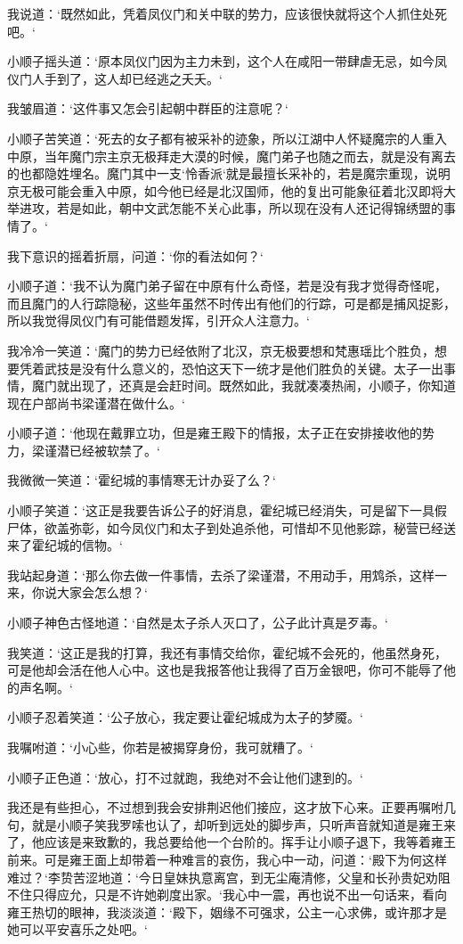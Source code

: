 我说道：‘既然如此，凭着凤仪门和关中联的势力，应该很快就将这个人抓住处死吧。‘

小顺子摇头道：‘原本凤仪门因为主力未到，这个人在咸阳一带肆虐无忌，如今凤仪门人手到了，这人却已经逃之夭夭。‘

我皱眉道：‘这件事又怎会引起朝中群臣的注意呢？‘

小顺子苦笑道：‘死去的女子都有被采补的迹象，所以江湖中人怀疑魔宗的人重入中原，当年魔门宗主京无极拜走大漠的时候，魔门弟子也随之而去，就是没有离去的也都隐姓埋名。魔门其中一支‘怜香派‘就是最擅长采补的，若是魔宗重现，说明京无极可能会重入中原，如今他已经是北汉国师，他的复出可能象征着北汉即将大举进攻，若是如此，朝中文武怎能不关心此事，所以现在没有人还记得锦绣盟的事情了。‘

我下意识的摇着折扇，问道：‘你的看法如何？‘

小顺子道：‘我不认为魔门弟子留在中原有什么奇怪，若是没有我才觉得奇怪呢，而且魔门的人行踪隐秘，这些年虽然不时传出有他们的行踪，可是都是捕风捉影，所以我觉得凤仪门有可能借题发挥，引开众人注意力。‘

我冷冷一笑道：‘魔门的势力已经依附了北汉，京无极要想和梵惠瑶比个胜负，想要凭着武技是没有什么意义的，恐怕这天下一统才是他们胜负的关键。太子一出事情，魔门就出现了，还真是会赶时间。既然如此，我就凑凑热闹，小顺子，你知道现在户部尚书梁谨潜在做什么。‘

小顺子道：‘他现在戴罪立功，但是雍王殿下的情报，太子正在安排接收他的势力，梁谨潜已经被软禁了。‘

我微微一笑道：‘霍纪城的事情寒无计办妥了么？‘

小顺子笑道：‘这正是我要告诉公子的好消息，霍纪城已经消失，可是留下一具假尸体，欲盖弥彰，如今凤仪门和太子到处追杀他，可惜却不见他影踪，秘营已经送来了霍纪城的信物。‘

我站起身道：‘那么你去做一件事情，去杀了梁谨潜，不用动手，用鸩杀，这样一来，你说大家会怎么想？‘

小顺子神色古怪地道：‘自然是太子杀人灭口了，公子此计真是歹毒。‘

我笑道：‘这正是我的打算，我还有事情交给你，霍纪城不会死的，他虽然身死，可是他却会活在他人心中。这也是我报答他让我得了百万金银吧，你可不能辱了他的声名啊。‘

小顺子忍着笑道：‘公子放心，我定要让霍纪城成为太子的梦魇。‘

我嘱咐道：‘小心些，你若是被揭穿身份，我可就糟了。‘

小顺子正色道：‘放心，打不过就跑，我绝对不会让他们逮到的。‘

我还是有些担心，不过想到我会安排荆迟他们接应，这才放下心来。正要再嘱咐几句，就是小顺子笑我罗嗦也认了，却听到远处的脚步声，只听声音就知道是雍王来了，他应该是来致歉的，我总要给他一个台阶的。挥手让小顺子退下，我等着雍王前来。可是雍王面上却带着一种难言的哀伤，我心中一动，问道：‘殿下为何这样难过？‘李贽苦涩地道：‘今日皇妹执意离宫，到无尘庵清修，父皇和长孙贵妃劝阻不住只得应允，只是不许她剃度出家。‘我心中一震，再也说不出一句话来，看向雍王热切的眼神，我淡淡道：‘殿下，姻缘不可强求，公主一心求佛，或许那才是她可以平安喜乐之处吧。‘

